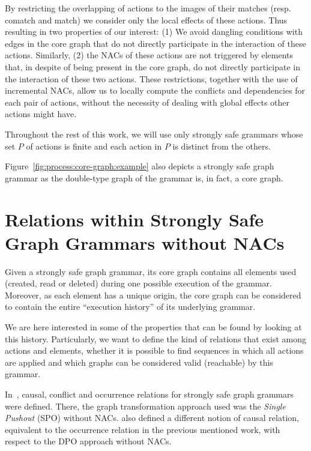   By restricting the overlapping of actions to the images of their matches (resp. comatch and match) we consider only the local effects of these actions. Thus resulting in two properties of our interest: (1) We avoid dangling conditions with edges in the core graph that do not directly participate in the interaction of these actions. Similarly, (2) the NACs of these actions are not triggered by elements that, in despite of being present in the core graph, do not directly participate in the interaction of these two actions. These restrictions, together with the use of incremental NACs, allow us to locally compute the conflicts and dependencies for each pair of actions, without the necessity of dealing with global effects other actions might have.

\begin{remark} Throughout the rest of this work, we will use only strongly safe grammars whose set $P$ of actions is finite and each action in $P$ is distinct from the others.

\hfill
\end{remark}

\begin{example} Figure~\ref{fig:process:core-graph:example} also depicts a strongly safe graph grammar as the double-type graph of the grammar is, in fact, a core graph.
\end{example}

\section{Relations within Strongly Safe Graph Grammars without NACs}

Given a strongly safe graph grammar, its core graph contains all elements used (created, read or deleted) during one possible execution of the grammar. Moreover, as each element has a unique origin, the core graph can be considered to contain the entire ``execution history'' of its underlying grammar.

We are here interested in some of the properties that can be found by looking at this history. Particularly, we want to define the kind of relations that exist among actions and elements, whether it is possible to find sequences in which all actions are applied and which graphs can be considered valid (reachable) by this grammar.

In~\cite{Ribeiro1996}, causal, conflict and occurrence relations for strongly safe graph grammars were defined. There, the graph transformation approach used was the \emph{Single Pushout} (SPO) without NACs. \cite{Corradini1996} also defined a different notion of causal relation, equivalent to the occurrence relation in the previous mentioned work, with respect to the DPO approach without NACs.

